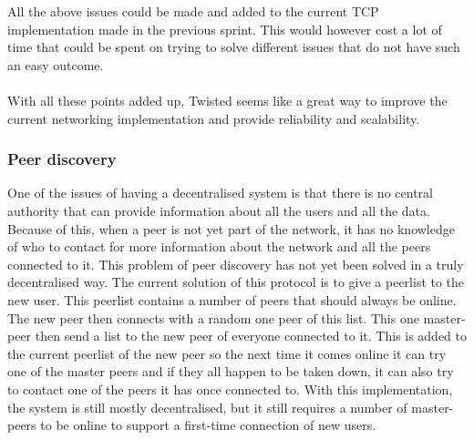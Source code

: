 All the above issues could be made and added to the current TCP implementation made in the previous sprint.
This would however cost a lot of time that could be spent on trying to solve different issues that do not have such an easy outcome. \\
\\
With all these points added up, Twisted seems like a great way to improve the current networking implementation and provide reliability and scalability.
\subsubsection{Peer discovery}
One of the issues of having a decentralised system is that there is no central authority that can provide information about all the users and all the data. 
Because of this, when a peer is not yet part of the network, it has no knowledge of who to contact for more information about the network and all the peers connected to it. 
This problem of peer discovery has not yet been solved in a truly decentralised way. 
The current solution of this protocol is to give a peerlist to the new user. 
This peerlist contains a number of peers that should always be online. 
The new peer then connects with a random one peer of this list. 
This one master-peer then send a list to the new peer of everyone connected to it. 
This is added to the current peerlist of the new peer so the next time it comes online it can try one of the master peers and if they all happen to be taken down, it can also try to contact one of the peers it has once connected to.
With this implementation, the system is still mostly decentralised, but it still requires a number of master-peers to be online to support a first-time connection of new users.
